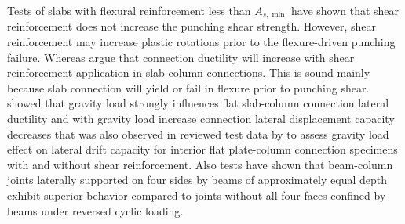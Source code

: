 \documentclass[twocolumn]{article} %
\begin{document}
Tests of slabs with flexural reinforcement less than $A_{s,\min{}}$ have shown that shear reinforcement does not increase the punching shear strength\citep{aci31819}. However, shear reinforcement may increase plastic rotations prior to the flexure-driven punching failure\citep{peiris2012flexural}. Whereas \cite{megally2000punching,kang2006,robertson2002cyclic} argue that connection ductility will increase with shear reinforcement application in slab-column connections. This is sound mainly because slab connection will yield or fail in flexure prior to punching shear. \cite{kang2006,megally2000punching,robertson1991,robertson1993,anggadjaja2008} showed that gravity load strongly influences flat slab-column connection lateral ductility and with gravity load increase connection lateral displacement capacity decreases that was also observed in reviewed test data by \cite{aci4212010} to assess gravity load effect on lateral drift capacity for interior flat plate-column connection specimens with and without shear reinforcement. Also tests have shown that beam-column joints laterally supported on four sides by beams of approximately equal depth exhibit superior behavior compared to joints without all four faces confined by beams under reversed cyclic loading\citep{hanson1967seismic}. 
\end{document}
